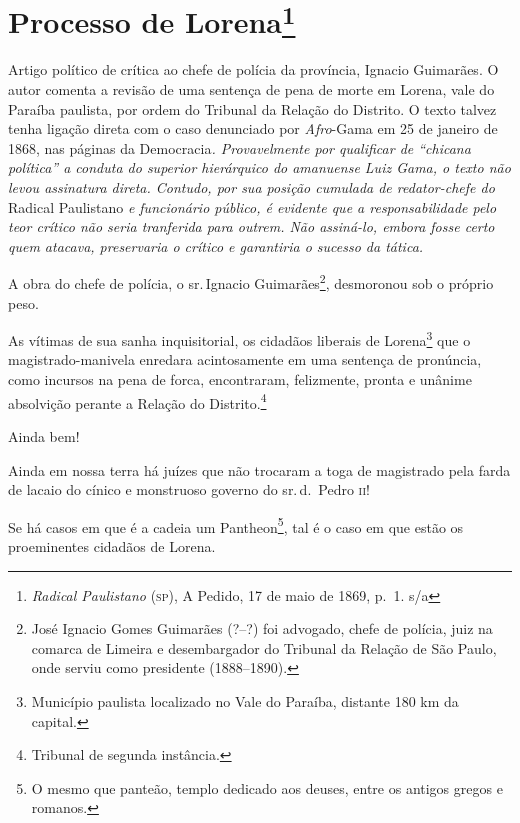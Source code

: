\chapter{Processo de Lorena\footnote{\emph{Radical Paulistano} (\textsc{sp}), A
  Pedido, 17 de maio de 1869, p.~1. s/a}}

\begin{didascalia}
Artigo político de crítica ao chefe de polícia da província, Ignacio
Guimarães. O autor comenta a revisão de uma sentença de pena de morte em
Lorena, vale do Paraíba paulista, por ordem do Tribunal da Relação do
Distrito. O texto talvez tenha ligação direta com o caso denunciado
por\emph{ Afro}-Gama em 25 de janeiro de 1868, nas páginas da Democracia\emph{.
Provavelmente por qualificar de ``chicana política'' a conduta do superior
hierárquico do amanuense Luiz Gama, o texto não levou assinatura direta.
Contudo, por sua posição cumulada de redator-chefe do} Radical
Paulistano \emph{e funcionário público, é evidente que a
responsabilidade pelo teor crítico não seria tranferida para outrem. Não
assiná-lo, embora fosse certo quem atacava, preservaria o crítico e
garantiria o sucesso da tática.}
\end{didascalia}



A obra do chefe de polícia, o sr.\,Ignacio Guimarães\footnote{José
  Ignacio Gomes Guimarães (?--?) foi advogado, chefe de polícia, juiz na
  comarca de Limeira e desembargador do Tribunal da Relação de São
  Paulo, onde serviu como presidente (1888--1890).}, desmoronou sob o
próprio peso.

As vítimas de sua sanha inquisitorial, os cidadãos liberais de
Lorena\footnote{Município paulista localizado no Vale do Paraíba,
  distante 180 km da capital.} que o magistrado-manivela enredara
acintosamente em uma sentença de pronúncia, como incursos na pena de
forca, encontraram, felizmente, pronta e unânime absolvição perante a
Relação do Distrito.\footnote{Tribunal de segunda instância.}

Ainda bem!

Ainda em nossa terra há juízes que não trocaram a toga de magistrado
pela farda de lacaio do cínico e monstruoso governo do sr.\,d.~Pedro \textsc{ii}!

Se há casos em que é a cadeia um Pantheon\footnote{O mesmo que
  panteão, templo dedicado aos deuses, entre os antigos gregos e
  romanos.}, tal é o caso em que estão os proeminentes cidadãos de
Lorena.

